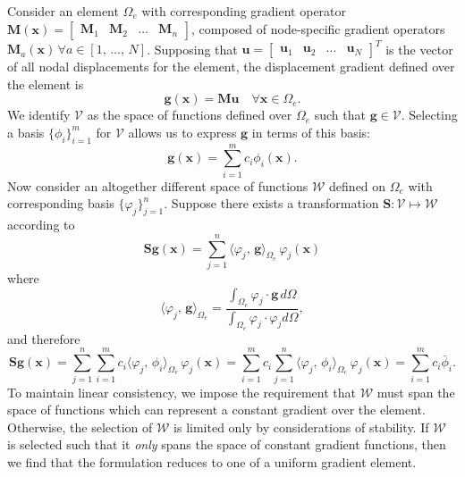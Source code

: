 \documentclass[12pt]{article}
\begin{document}
Consider an element $\Omega_e$ with corresponding gradient operator $\mathbf{M} (\mathbf{x}) = \left[ \begin{array}{cccc} \mathbf{M}_1 & \mathbf{M}_2 & \ldots & \mathbf{M}_n \end{array} \right]$, composed of node-specific gradient operators $\mathbf{M}_a (\mathbf{x}) \, \forall a \in [ 1, \, \ldots , \, N ]$. Supposing that $\mathbf{u} = \left[ \begin{array}{cccc} \mathbf{u}_1 & \mathbf{u}_2 & \ldots & \mathbf{u}_N \end{array} \right]^T$ is the vector of all nodal displacements for the element, the displacement gradient defined over the element is
\begin{equation}
	\mathbf{g} (\mathbf{x}) = \mathbf{M} \mathbf{u} \quad \forall \mathbf{x} \in \Omega_e .
\end{equation}
We identify $\mathcal{V}$ as the space of functions defined over $\Omega_e$ such that $\mathbf{g} \in \mathcal{V}$. Selecting a basis $\{ \phi_i \}_{i=1}^{m}$ for $\mathcal{V}$ allows us to express $\mathbf{g}$ in terms of this basis:
\begin{equation}
	\mathbf{g} (\mathbf{x}) = \sum_{i=1}^{m} c_i \phi_i (\mathbf{x}) .
\end{equation}
Now consider an altogether different space of functions $\mathcal{W}$ defined on $\Omega_e$ with corresponding basis $\{ \varphi_j \}_{j=1}^{n}$. Suppose there exists a transformation $\mathbf{S} \colon \mathcal{V} \mapsto \mathcal{W}$ according to
\begin{equation}
	\mathbf{S} \mathbf{g} ( \mathbf{x} ) = \sum_{j = 1}^{n} \langle \varphi_j , \, \mathbf{g} \rangle_{\Omega_e} \, \varphi_j ( \mathbf{x} )
\end{equation}
where
\begin{equation}
	\langle \varphi_j , \, \mathbf{g} \rangle_{\Omega_e} = \frac{\int_{\Omega_e} \varphi_j \cdot \mathbf{g} \, d \Omega}{\int_{\Omega_e} \varphi_j \cdot \varphi_j  d \Omega},
\end{equation}
and therefore
\begin{equation}
	\mathbf{S} \mathbf{g} ( \mathbf{x} ) = \sum_{j = 1}^{n} \sum_{i = 1}^{m} c_i \langle \varphi_j , \, \phi_i \rangle_{\Omega_e} \, \varphi_j ( \mathbf{x} )  = \sum_{i = 1}^{m} c_i \sum_{j = 1}^{n} \langle \varphi_j , \, \phi_i \rangle_{\Omega_e} \, \varphi_j ( \mathbf{x} ) = \sum_{i = 1}^{m} c_i \bar{\phi}_i .
\end{equation}
To maintain linear consistency, we impose the requirement that $\mathcal{W}$ must span the space of functions which can represent a constant gradient over the element. Otherwise, the selection of $\mathcal{W}$ is limited only by considerations of stability. If $\mathcal{W}$ is selected such that it \textit{only} spans the space of constant gradient functions, then we find that the formulation reduces to one of a uniform gradient element.
\end{document}
